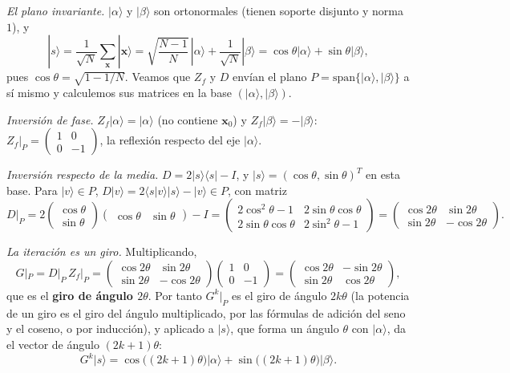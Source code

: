 \documentclass[11pt, a4paper, twoside, openright]{report}
\providecommand{\ket}[1]{|#1\rangle}
\providecommand{\bra}[1]{\langle #1|}
\providecommand{\braket}[2]{\langle #1|#2\rangle}
\newcommand{\bx}{\mathbf{x}}
\begin{document}
\begin{demo}
\textit{El plano invariante.} $\ket{\alpha}$ y $\ket{\beta}$ son ortonormales (tienen soporte disjunto y norma $1$), y
\[ \ket{s} = \frac{1}{\sqrt N}\sum_{\bx}\ket{\bx} = \sqrt{\frac{N-1}{N}}\,\ket{\alpha} + \frac{1}{\sqrt N}\ket{\beta} = \cos\theta\ket{\alpha} + \sin\theta\ket{\beta}, \]
pues $\cos\theta = \sqrt{1 - 1/N}$. Veamos que $Z_f$ y $D$ envían el plano $P = \mathrm{span}\{\ket{\alpha},\ket{\beta}\}$ a sí mismo y calculemos sus matrices en la base $(\ket{\alpha},\ket{\beta})$.

\textit{Inversión de fase.} $Z_f\ket{\alpha} = \ket{\alpha}$ (no contiene $\bx_0$) y $Z_f\ket{\beta} = -\ket{\beta}$:
$Z_f|_P = \left(\begin{smallmatrix} 1 & 0\\ 0 & -1\end{smallmatrix}\right)$, la reflexión respecto del eje $\ket{\alpha}$.

\textit{Inversión respecto de la media.} $D = 2\ket{s}\bra{s} - I$, y $\ket{s} = (\cos\theta, \sin\theta)^T$ en esta base. Para $\ket{v}\in P$, $D\ket{v} = 2\braket{s}{v}\ket{s} - \ket{v}\in P$, con matriz
\[ D|_P = 2\begin{pmatrix}\cos\theta\\ \sin\theta\end{pmatrix}\begin{pmatrix}\cos\theta & \sin\theta\end{pmatrix} - I = \begin{pmatrix} 2\cos^2\theta - 1 & 2\sin\theta\cos\theta \\ 2\sin\theta\cos\theta & 2\sin^2\theta - 1\end{pmatrix} = \begin{pmatrix}\cos2\theta & \sin2\theta \\ \sin2\theta & -\cos2\theta\end{pmatrix}. \]

\textit{La iteración es un giro.} Multiplicando,
\[ G|_P = D|_P\,Z_f|_P = \begin{pmatrix}\cos2\theta & \sin2\theta \\ \sin2\theta & -\cos2\theta\end{pmatrix}\begin{pmatrix} 1 & 0\\ 0 & -1\end{pmatrix} = \begin{pmatrix}\cos2\theta & -\sin2\theta \\ \sin2\theta & \cos2\theta\end{pmatrix}, \]
que es el \textbf{giro de ángulo $2\theta$}. Por tanto $G^k|_P$ es el giro de ángulo $2k\theta$ (la potencia de un giro es el giro del ángulo multiplicado, por las fórmulas de adición del seno y el coseno, o por inducción), y aplicado a $\ket{s}$, que forma un ángulo $\theta$ con $\ket{\alpha}$, da el vector de ángulo $(2k+1)\theta$:
\[ G^k\ket{s} = \cos\big((2k+1)\theta\big)\ket{\alpha} + \sin\big((2k+1)\theta\big)\ket{\beta}. \]


\end{demo}
\end{document}
